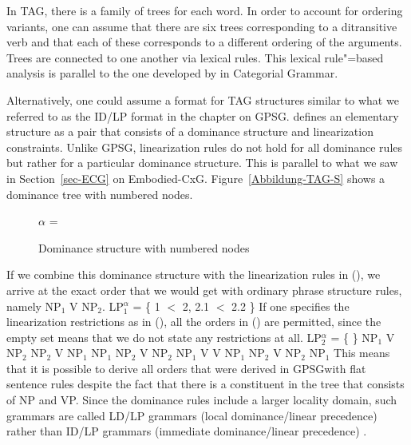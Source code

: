 In TAG, there is a family of trees for each word. In order to account for ordering variants, one can assume that there
are six trees corresponding to a ditransitive verb and that each of these corresponds to a different ordering of the arguments.
Trees are connected to one another via lexical rules. This lexical rule"=based
analysis is parallel to the one developed by \citet{Uszkoreit86b} in Categorial Grammar. 

Alternatively, one could assume a format for TAG structures similar to what we referred to as the
ID/LP format in the chapter
on GPSG. \citet{Joshi87b} defines an elementary structure as a pair that consists of a dominance structure and linearization constraints.
Unlike GPSG, linearization rules do not hold for all dominance rules but rather for a particular dominance structure. This is parallel to what
we saw in Section~\ref{sec-ECG} on Embodied-CxG. Figure~\vref{Abbildung-TAG-S} shows a dominance tree with numbered nodes.
\begin{figure}
\centerline{%
$\alpha$ = 
}
\caption{\label{Abbildung-TAG-S}Dominance structure with numbered nodes}
\end{figure}%
If we combine this dominance structure with the linearization rules in (), we arrive at the exact order that we would get with
ordinary phrase structure rules, namely NP$_1$ V NP$_2$.
\ea
LP$^\alpha_1$ = \{ 1 $<$ 2, 2.1 $<$ 2.2 \}
\z
If one specifies the linearization restrictions as in (), all the orders in () are permitted, since the empty set means that we do not state any restrictions at all.
\ea
LP$^\alpha_2$ = \{ \}
\z
\eal
\ex NP$_1$ V NP$_2$
\ex NP$_2$ V NP$_1$
\ex NP$_1$ NP$_2$ V 
\ex NP$_2$ NP$_1$ V
\ex V NP$_1$ NP$_2$
\ex V NP$_2$ NP$_1$ 
\zl
This means that it is possible to derive all orders that were derived in GPSG\indexgpsg with flat sentence rules despite the fact that there is
a constituent in the tree that consists of NP and VP. Since the dominance rules include a larger
locality domain, such grammars are called LD/LP grammars (local dominance/linear precedence) rather
than ID/LP grammars (immediate dominance/linear precedence) \citep*{JSW90a-u}.

